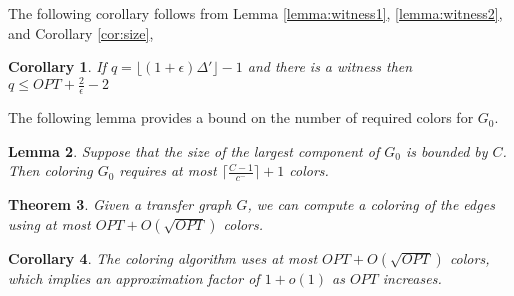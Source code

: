 \documentclass[titlepage, 11pt]{article}
\newtheorem{theorem}{Theorem}
\newtheorem{lemma}[theorem]{Lemma}
\newtheorem{corollary}[theorem]{Corollary}
\begin{document}
The following corollary follows from Lemma \ref{lemma:witness1}, \ref{lemma:witness2}, 
and Corollary \ref{cor:size}, 

\begin{corollary}\label{cor:cwitness}
If $q = \lfloor (1 + \epsilon) \Delta' \rfloor - 1$ and 
there is a witness then $q \leq OPT + \frac{2}{\epsilon } - 2$
\end{corollary}

The following lemma provides a bound on the number of required colors for $G_0$.
\begin{lemma} \label{lemma:G0}
Suppose that the size of the largest component of $G_0$ is bounded by $C$. 
Then coloring $G_0$ requires at most $\lceil \frac{C-1}{c^-} \rceil  + 1$ colors.
\end{lemma}

\begin{theorem}
Given a transfer graph $G$, we can compute a coloring of the edges using at most $OPT +  O\left(\sqrt{OPT}\right)$
colors.
\end{theorem}

\begin{corollary}
The coloring algorithm uses at most $OPT +  O(\sqrt{OPT})$ colors, which implies an approximation factor of $1 + o(1)$ as  $OPT$ increases.
\end{corollary}






 
\end{document}
